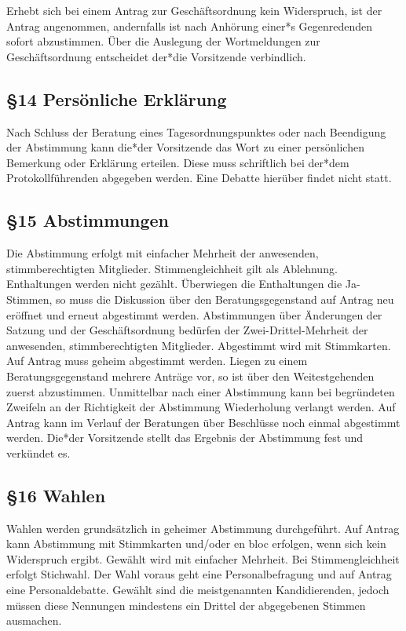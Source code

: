 \documentclass[12pt]{report}
\begin{document}
\begin{justify}
Erhebt sich bei einem Antrag zur Geschäftsordnung kein Widerspruch, ist der Antrag angenommen,
andernfalls ist nach Anhörung einer*s Gegenredenden sofort abzustimmen. Über die Auslegung der Wortmeldungen
zur Geschäftsordnung entscheidet der*die Vorsitzende verbindlich.

\subsection*{§14 Persönliche Erklärung}
Nach Schluss der Beratung eines Tagesordnungspunktes oder nach Beendigung der Abstimmung kann
die*der Vorsitzende das Wort zu einer persönlichen Bemerkung oder Erklärung erteilen. Diese muss
schriftlich bei der*dem Protokollführenden abgegeben werden. Eine Debatte hierüber findet nicht statt.
\subsection*{§15 Abstimmungen}
Die Abstimmung erfolgt mit einfacher Mehrheit der anwesenden, stimmberechtigten Mitglieder.
Stimmengleichheit gilt als Ablehnung. Enthaltungen werden nicht gezählt. Überwiegen die Enthaltungen
die Ja-Stimmen, so muss die Diskussion über den Beratungsgegenstand auf Antrag neu eröffnet und erneut
abgestimmt werden. Abstimmungen über Änderungen der Satzung und der Geschäftsordnung bedürfen der 
Zwei-Drittel-Mehrheit der anwesenden, stimmberechtigten Mitglieder. Abgestimmt wird mit Stimmkarten.
Auf Antrag muss geheim abgestimmt werden. Liegen zu einem Beratungsgegenstand mehrere Anträge vor, so ist
über den Weitestgehenden zuerst abzustimmen. Unmittelbar nach einer Abstimmung kann bei begründeten
Zweifeln an der Richtigkeit der Abstimmung Wiederholung verlangt werden. Auf Antrag kann im Verlauf der
Beratungen über Beschlüsse noch einmal abgestimmt werden. Die*der Vorsitzende stellt das Ergebnis der
Abstimmung fest und verkündet es.
\subsection*{§16 Wahlen}
Wahlen werden grundsätzlich in geheimer Abstimmung durchgeführt. Auf Antrag kann Abstimmung mit
Stimmkarten und/oder en bloc erfolgen, wenn sich kein Widerspruch ergibt. Gewählt wird mit einfacher Mehrheit. Bei
Stimmengleichheit erfolgt Stichwahl. Der Wahl voraus geht eine Personalbefragung und auf Antrag eine
Personaldebatte. Gewählt sind die meistgenannten Kandidierenden, jedoch müssen diese Nennungen mindestens
ein Drittel der abgegebenen Stimmen ausmachen.


\end{justify}
\end{document}
